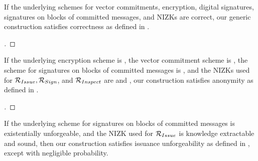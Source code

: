 \begin{theorem}
  \label{thm:correctness-uas}
  If the underlying schemes for vector commitments, encryption, digital
  signatures, signatures on blocks of committed messages, and NIZKs are
  correct, our generic construction \CUASGen satisfies correctness as
  defined in .
\end{theorem}

\begin{proof}[]
\end{proof}

\begin{theorem}
  \label{thm:anonymity-uas}
  If the underlying encryption scheme is , the vector commitment
  scheme is , the scheme for signatures on blocks of committed
  messages is , and the NIZKs used for $\mathcal{R}_{Issue},
  \mathcal{R}_{Sign}$, and $\mathcal{R}_{Inspect}$ are  and
  , our \CUASGen construction satisfies anonymity as
  defined in .
\end{theorem}

\begin{proof}[]
\end{proof}

\begin{theorem}
  \label{thm:issue-forge-uas}
  If the underlying scheme for signatures on blocks of committed messages is
  existentially unforgeable, and the NIZK used for $\mathcal{R}_{Issue}$ is
  knowledge extractable and sound, then our \CUASGen construction satisfies
  issuance unforgeability as defined in , except
  with negligible probability.
\end{theorem}


